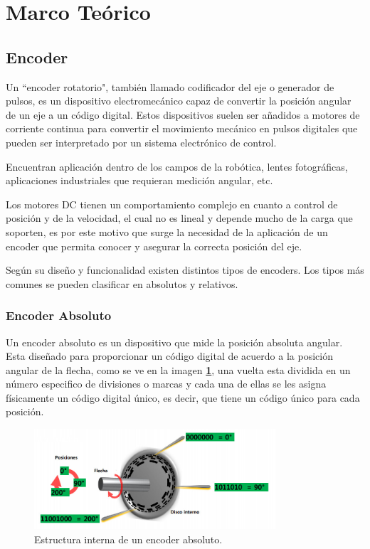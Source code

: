 \documentclass[11pt, a4paper]{article}
\begin{document}
\section{Marco Teórico}
	\subsection{Encoder}
	Un ``encoder rotatorio", también llamado codificador del eje o generador de pulsos, es un dispositivo electromecánico capaz de convertir la posición angular de un eje a un código digital. Estos dispositivos suelen ser añadidos a motores de corriente continua para convertir el movimiento mecánico en pulsos digitales que pueden ser interpretado por un sistema electrónico de control. 

	Encuentran aplicación dentro de los campos de la robótica, lentes fotográficas, aplicaciones industriales que requieran medición angular, etc.

	Los motores DC tienen un comportamiento complejo en cuanto a control de posición y de la velocidad, el cual no es lineal y depende mucho de la carga que soporten, es por este motivo que surge la necesidad de la aplicación de un encoder que permita conocer y asegurar la correcta posición del eje.

	Según su diseño y funcionalidad existen distintos tipos de encoders. Los tipos más comunes se pueden clasificar en absolutos y relativos.

	\subsubsection{Encoder Absoluto}
	Un encoder absoluto es un dispositivo que mide la posición absoluta angular. Esta diseñado para proporcionar un código digital de acuerdo a la posición angular de la flecha, como se ve en la imagen \textcolor{blue}{\textbf{\ref{fig:encoder_absoluto}}}, una vuelta esta dividida en un número especifico de divisiones o marcas y cada una de ellas se les asigna físicamente un código digital único, es decir, que tiene un código único para cada posición. 

\begin{figure}[h]
	\centering
	\includegraphics[width=0.8\textwidth]{Imagenes/encoder_absoluto.jpg}
	\caption{Estructura interna de un encoder absoluto.}
	\label{fig:encoder_absoluto}
\end{figure} 
\end{document}
